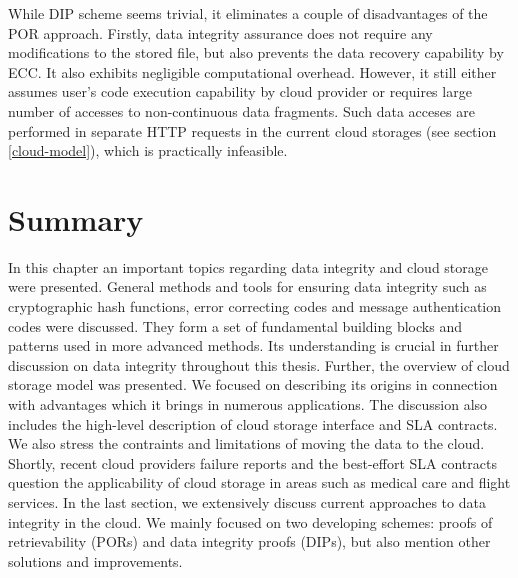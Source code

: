 While DIP scheme seems trivial, it eliminates a couple of disadvantages of the
POR approach. Firstly, data integrity assurance does not require any
modifications to the stored file, but also prevents the data recovery
capability by ECC. It also exhibits negligible computational overhead.
However, it still either assumes user's code execution capability by cloud
provider or requires large number of accesses to non-continuous data fragments.
Such data acceses are performed in separate HTTP requests in the current
cloud storages (see section \ref{cloud-model}), which is practically
infeasible. 

\section{Summary}
In this chapter an important topics regarding data integrity and cloud storage were presented.
General methods and tools for ensuring data integrity such as cryptographic hash functions,
error correcting codes and message authentication codes were discussed. They form a set of
fundamental building blocks and patterns used in more advanced methods. Its understanding 
is crucial in further discussion on data integrity throughout this thesis. Further, the
overview of cloud storage model was presented. We focused on describing its origins in connection
with advantages which it brings in numerous applications. The discussion also includes the
high-level description of cloud storage interface and SLA contracts. We also stress the contraints
and limitations of moving the data to the cloud. Shortly, recent cloud providers failure reports
and the best-effort SLA contracts question the applicability of cloud storage in areas
such as medical care and flight services. In the last section, we extensively discuss current
approaches to data integrity in the cloud. We mainly focused on two developing schemes: proofs
of retrievability (PORs) and data integrity proofs (DIPs), but also mention other solutions and
improvements. 
